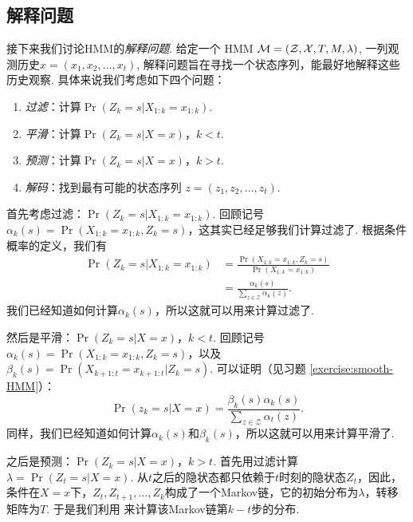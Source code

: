 \subsection{解释问题}
接下来我们讨论HMM的\emph{解释问题}. 给定一个 HMM $\mathcal M = (\mathcal Z, \mathcal X, T, M, \lambda)$, 一列观测历史$x = (x_1, x_2, \dots, x_t)$, 解释问题旨在寻找一个状态序列，能最好地解释这些历史观察. 具体来说我们考虑如下四个问题：
\begin{enumerate}
    \item \emph{过滤}：计算$\Pr(Z_k = s|X_{1:k}=x_{1:k})$.
    \item \emph{平滑}：计算$\Pr(Z_k = s|X=x)$，$k < t$.
    \item \emph{预测}：计算$\Pr(Z_k = s|X=x)$，$k > t$.
    \item \emph{解码}：找到最有可能的状态序列 $z = (z_1, z_2, \dots, z_t)$.
\end{enumerate}

首先考虑过滤：$\Pr(Z_k = s|X_{1:k}=x_{1:k})$. 回顾记号$\alpha_k(s)= \Pr(X_{1:k}=x_{1:k}, Z_k=s)$，这其实已经足够我们计算过滤了. 根据条件概率的定义，我们有
\begin{align*}
    \Pr(Z_k = s|X_{1:k}=x_{1:k}) & = \frac{\Pr(X_{1:k}=x_{1:k}, Z_k=s)}{\Pr(X_{1:k}=x_{1:k})} \\
    &= \frac{\alpha_k(s)}{\sum_{z\in\mathcal Z}\alpha_k(z)}.
\end{align*}
我们已经知道如何计算$\alpha_k(s)$，所以这就可以用来计算过滤了.

然后是平滑：$\Pr(Z_k = s|X=x)$，$k < t$.  回顾记号$\alpha_k(s)= \Pr(X_{1:k}=x_{1:k}, Z_k=s)$，以及$\beta_k(s)=\Pr(X_{k+1:t}=x_{k+1:t} |Z_k=s)$. 可以证明（见习题 \ref{exercise:smooth-HMM}）：
\begin{equation}
    \Pr(z_k = s|X=x)=\frac{\beta_k(s)\alpha_k(s)}{\sum_{z\in\mathcal Z}\alpha_t(z)}.\label{eq:smooth}
\end{equation}
同样，我们已经知道如何计算$\alpha_k(s)$和$\beta_k(s)$，所以这就可以用来计算平滑了.

之后是预测：$\Pr(Z_k = s|X=x)$，$k > t$. 首先用过滤计算 $\lambda=\Pr(Z_t = s|X=x)$. 从$t$之后的隐状态都只依赖于$t$时刻的隐状态$Z_t$，因此，条件在$X=x$下，$Z_t,Z_{t+1},\dots,Z_k$构成了一个Markov链，它的初始分布为$\lambda$，转移矩阵为$T$. 于是我们利用 来计算该Markov链第$k-t$步的分布.

